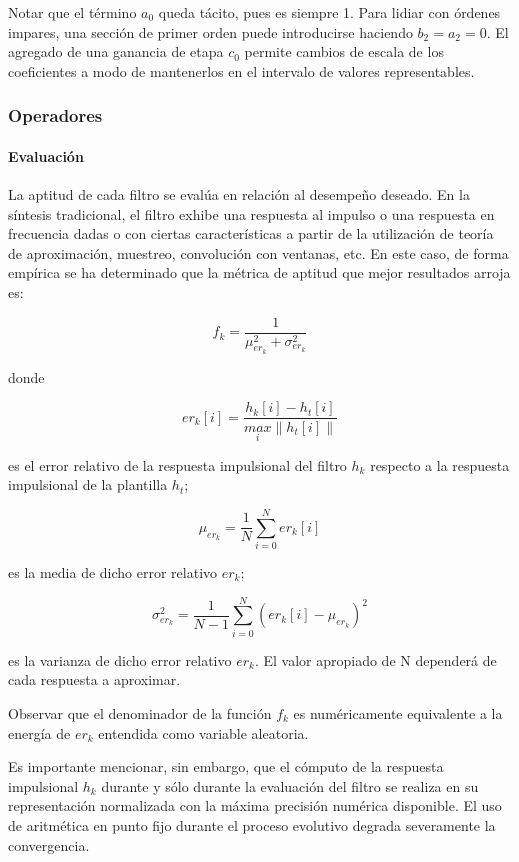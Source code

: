 \documentclass[11pt, journal]{IEEEtran}
\begin{document}
Notar que el término \(a_0\) queda tácito, pues es siempre 1. Para
lidiar con órdenes impares, una sección de primer orden puede
introducirse haciendo \(b_2 = a_2 = 0\). El agregado de una ganancia de
etapa \(c_0\) permite cambios de escala de los coeficientes a modo de
mantenerlos en el intervalo de valores representables.

\subsubsection{Operadores}

\paragraph{Evaluación}

La aptitud de cada filtro se evalúa en relación al desempeño deseado. En
la síntesis tradicional, el filtro exhibe una respuesta al impulso o una
respuesta en frecuencia dadas o con ciertas características a partir de
la utilización de teoría de aproximación, muestreo, convolución con
ventanas, etc. En este caso, de forma empírica se ha determinado que la
métrica de aptitud que mejor resultados arroja es:

\[
f_k = \frac{1}{\mu_{er_k}^2 + \sigma_{er_k}^2}
\]

donde

\[
er_k[i] = \frac{h_k[i] - h_t[i]}{\underset{i}{max} \|h_t[i]\|}
\]

es el error relativo de la respuesta impulsional del filtro \(h_k\)
respecto a la respuesta impulsional de la plantilla \(h_t\);

\[
\mu_{er_k} = \frac{1}{N} \sum^N_{i = 0} er_k[i]
\]

es la media de dicho error relativo \(er_k\);

\[
\sigma^2_{er_k} = \frac{1}{N - 1} \sum^N_{i = 0} (er_k[i] - \mu_{er_k})^2
\]

es la varianza de dicho error relativo \(er_k\). El valor apropiado de N
dependerá de cada respuesta a aproximar.

Observar que el denominador de la función \(f_k\) es numéricamente
equivalente a la energía de \(er_k\) entendida como variable aleatoria.

Es importante mencionar, sin embargo, que el cómputo de la respuesta
impulsional \(h_k\) durante y sólo durante la evaluación del filtro se
realiza en su representación normalizada con la máxima precisión
numérica disponible. El uso de aritmética en punto fijo durante el
proceso evolutivo degrada severamente la convergencia.
\end{document}
